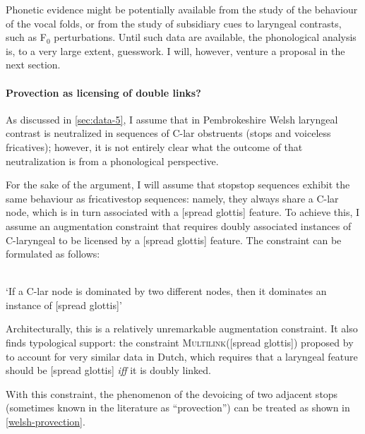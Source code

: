 Phonetic evidence might be potentially available from the study of the behaviour of the vocal folds, or from the study of subsidiary cues to laryngeal contrasts, such as F$_{0}$ perturbations. Until such data are available, the phonological analysis is, to a very large extent, guesswork. I will, however, venture a proposal in the next section.

\paragraph{Provection as licensing of double links?}
\label{sec:prov-as-licens}

As discussed in \cref{sec:data-5}, I assume that in Pembrokeshire Welsh laryngeal contrast is neutralized in sequences of C-lar obstruents (\ie stops and voiceless fricatives); however, it is not entirely clear what the outcome of that neutralization is from a phonological perspective.

For the sake of the argument, I will assume that stop\endash stop sequences exhibit the same behaviour as fricative\endash stop sequences: namely, they always share a C-lar node, which is in turn associated with a [spread glottis] feature. To achieve this, I assume an augmentation constraint that requires doubly associated instances of C-laryngeal to be licensed by a [spread glottis] feature. The constraint can be formulated as follows:

\begin{constraint}
\label{def:have-sg-double}  \\
  `If a C-lar node is dominated by two different nodes, then it dominates an instance of [spread glottis]'
\end{constraint}

Architecturally, this is a relatively unremarkable augmentation constraint. It also finds typological support: \cf the constraint \textsc{Multilink}([spread glottis]) proposed by \citet{oostendorp07:_excep} to account for very similar data in Dutch, which requires that a laryngeal feature should be [spread glottis] \emph{iff} it is doubly linked.

With this constraint, the phenomenon of the devoicing of two adjacent stops (sometimes known in the literature as \enquote{provection}) can be treated as shown in \ref{welsh-provection}.

